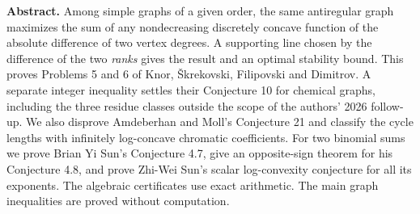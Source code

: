 \documentclass[11pt,a4paper]{article}
\theoremstyle{definition}\newtheorem{problem}[theorem]{Problem}
\begin{document}
\thispagestyle{plain}
\par
\vspace{9pt}
\vspace{7pt}
\par
\vspace{11pt}
\noindent\textbf{Abstract.}
Among simple graphs of a given order, the same antiregular graph maximizes
the sum of any nondecreasing discretely concave function of the absolute
difference of two vertex degrees. A supporting line chosen by the difference
of the two \emph{ranks} gives the result and an optimal stability bound.
This proves Problems 5 and 6 of Knor, \v{S}krekovski, Filipovski and
Dimitrov. A separate integer inequality settles their Conjecture 10 for
chemical graphs, including the three residue classes outside the scope
of the authors' 2026 follow-up.
We also disprove Amdeberhan and Moll's Conjecture 21 and classify the
cycle lengths with infinitely log-concave chromatic coefficients.
For two binomial sums we prove Brian Yi Sun's Conjecture 4.7,
give an opposite-sign theorem for his Conjecture 4.8, and prove
Zhi-Wei Sun's scalar log-convexity conjecture for all its exponents.
The algebraic certificates use exact arithmetic. The main graph
inequalities are proved without computation.
\vspace{5pt}
\end{document}
